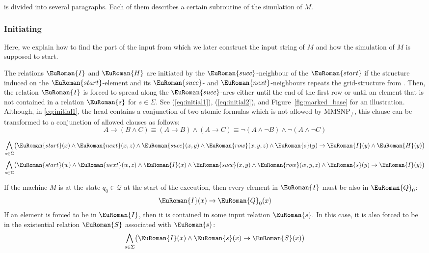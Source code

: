 \documentclass[10pt,a4paper]{amsart}
\theoremstyle{plain}
\theoremstyle{definition}
\numberwithin{equation}{section}
\newcommand{\eurm}[1]{\EuRoman{#1}} %
\newcommand{\euca}[1]{\mathcal{#1}} %
\newcommand{\rel}[1]{\eurm{#1}} %
\newcommand{\family}[1]{\euca{#1}} %
\newcommand{\MMSNPineq}[0]{\ensuremath{\textrm{MMSNP}_{\not=}}}
\begin{document}
 is divided into several paragraphs. 
Each of them describes a certain subroutine of the simulation of $M$.

\subsubsection*{Initiating}




Here, we explain how to find the part of the input from which we later construct the input string of $M$ and how the simulation of $M$ is supposed to start.

The relations $\rel{I}$ and $\rel{H}$ are initiated by the $\rel{succ}$-neighbour of the $\rel{start}$ if the structure induced on the $\rel{start}$-element and its $\rel{succ}$- and $\rel{next}$-neighbours repeats the grid-structure from .
Then, the relation $\rel{I}$ is forced to spread  along the $\rel{succ}$-arcs either until the end of the first row or until an element that is not contained in a relation $\rel{s}$ for $s\in\Sigma$.
See (\ref{eq:initial1}), (\ref{eq:initial2}), and Figure~\ref{fig:marked_base} for an illustration.
Although, in \cref{eq:initial1}, the head contains a conjunction of two atomic formulas which is not allowed by $\MMSNPineq$, this clause can be transformed to a conjunction of allowed clauses as follows:
\begin{equation*}
A\rightarrow(B\wedge C)\equiv (A\rightarrow B)\wedge (A\rightarrow C)\equiv \neg (A\wedge \neg B)\wedge \neg(A\wedge\neg C)
\end{equation*}




\begin{equation}\label{eq:initial1}
\bigwedge_{s\in\Sigma}\bigl(\rel{start}(x)\wedge\rel{next}(x,z)\wedge\rel{succ}(x,y)\wedge\rel{row}(x,y,z)\wedge\rel{s}(y)\rightarrow\rel{I}(y)\wedge\rel{H}(y)\bigr)
\end{equation}
\begin{equation}\label{eq:initial2}
\bigwedge_{s\in\Sigma}\bigl(\rel{start}(w)\wedge\rel{next}(w,z)\wedge\rel{I}(x)\wedge\rel{succ}(x,y)\wedge\rel{row}(w,y,z)\wedge\rel{s}(y)\rightarrow\rel{I}(y)\bigr)
\end{equation}


If the machine $M$ is at the state $q_0\in\family{Q}$ at the start of the execution, then every element in $\rel{I}$ must be also in $\rel{Q}_0$:
\begin{equation}\label{eq:initiating_q}
\rel{I}(x)\to\rel{Q}_0(x)
\end{equation}
If an element is forced to be in $\rel{I}$, then it is contained in some input relation $\rel{s}$.
In this case, it is also forced to be in the existential relation $\rel{S}$ associated with $\rel{s}$:
\begin{equation}\label{eq:initiating_s}
\bigwedge_{s\in\Sigma}\bigl(\rel{I}(x)\wedge\rel{s}(x)\to\rel{S}(x)\bigr)
\end{equation}
\end{document}
